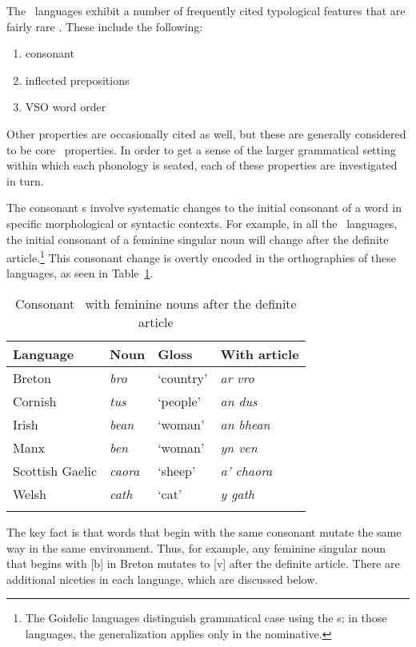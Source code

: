 \documentclass[output=paper,colorlinks,citecolor=brown]{langscibook}
\begin{document}
The \ce\ languages exhibit a number of frequently cited typological features that are fairly rare \citep{mm:fife_typological_2010}. These include the following:

\begin{enumerate}
\item consonant \m{}
\item inflected prepositions
\item VSO word order
\end{enumerate}

\noindent Other properties are occasionally cited as well, but these  are generally considered to be core \ce\ properties. In order to get a sense of the larger grammatical setting within which each phonology is seated, each of these properties are investigated in turn.

The consonant \m s involve systematic changes to the initial consonant of a word in specific morphological or syntactic contexts. For example, in all the \ce\ languages, the initial consonant of a feminine singular noun will change after the definite article.\footnote{The Goidelic languages distinguish grammatical case using the \m s; in those languages, the generalization applies only in the nominative.} This consonant change is overtly encoded in the orthographies of these languages, as seen in Table~\ref{fem.muts.tab}.

\begin{table}
\caption{Consonant \m\ with feminine nouns after the definite article}
\label{fem.muts.tab}
\begin{tabular}{llll}
\lsptoprule
Language & Noun  & Gloss     & With article \\
\midrule
Breton      & \itshape bro   & `country' & \itshape ar vro \\
Cornish      & \itshape tus   & `people'  & \itshape an dus \\
Irish      & \itshape bean  & `woman'   & \itshape an bhean \\
Manx      & \itshape ben   & `woman'   & \itshape yn ven \\
Scottish Gaelic      & \itshape caora & `sheep'   & \itshape a' chaora \\
Welsh       & \itshape cath  & `cat'     & \itshape y gath \\
\lspbottomrule
\end{tabular}
\end{table}

The key fact is that words that begin with the same consonant mutate the same way in the same environment. Thus, for example, any feminine singular noun that begins with [b] in Breton mutates to [v] after the definite article. There are additional niceties in each language, which are discussed below.
\end{document}
